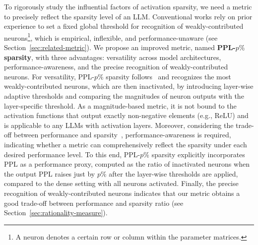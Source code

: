 \documentclass{article} %
\begin{document}
To rigorously study the influential factors of activation sparsity, we need a metric to precisely reflect the sparsity level of an LLM. Conventional works rely on prior experience to set a fixed global threshold for recognition of weakly-contributed neurons\footnote{A neuron denotes a certain row or column within the parameter matrices.}, which is empirical, inflexible, and performance-unaware (see Section~\ref{sec:related-metric}). We propose an improved metric, named \textbf{PPL-$p\%$ sparsity}, with three advantages: versatility across model architectures, performance-awareness, and the precise recognition of weakly-contributed neurons.
For versatility, PPL-$p\%$ sparsity follows~\citet{zhang2024relu} and recognizes the most weakly-contributed neurons, which are then inactivated, by introducing layer-wise adaptive thresholds and comparing the magnitudes of neuron outputs with the layer-specific threshold. As a magnitude-based metric, it is not bound to the activation functions that output exactly non-negative elements (e.g., ReLU) and is applicable to any LLMs with activation layers.
Moreover, considering the trade-off between performance and sparsity~\citep{song2024prosparse}, performance-awareness is required, indicating whether a metric can comprehensively reflect the sparsity under each desired performance level. To this end, PPL-$p\%$ sparsity explicitly incorporates PPL as a performance proxy, computed as the ratio of inactivated neurons when the output PPL raises just by $p\%$ after the layer-wise thresholds are applied, compared to the dense setting with all neurons activated.
Finally, the precise recognition of weakly-contributed neurons indicates that our metric obtains a good trade-off between performance and sparsity ratio (see Section~\ref{sec:rationality-measure}).

\end{document}
